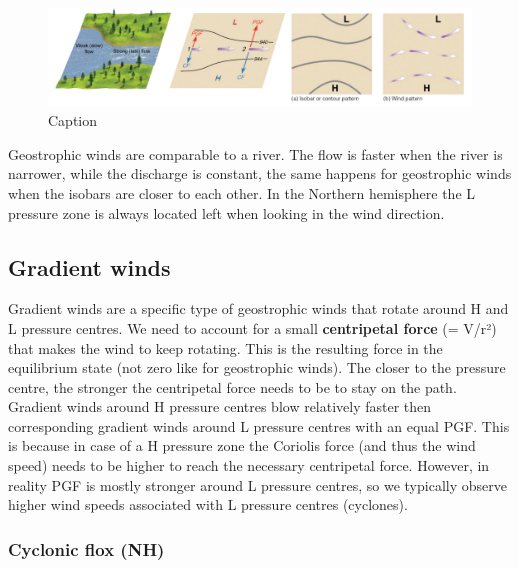 \documentclass[12pt,oneside]{book}
\begin{document}
\begin{figure}

{\centering \includegraphics[width=0.8\linewidth]{figures/Figure49} 

}

\caption{Caption}\label{fig:PGF}
\end{figure}

Geostrophic winds are comparable to a river. The flow is faster when the
river is narrower, while the discharge is constant, the same happens for
geostrophic winds when the isobars are closer to each other. In the
Northern hemisphere the L pressure zone is always located left when
looking in the wind direction.

\subsection{Gradient winds}\label{gradient-winds}

Gradient winds are a specific type of geostrophic winds that rotate
around H and L pressure centres. We need to account for a small
\textbf{centripetal force} (= V/r²) that makes the wind to keep
rotating. This is the resulting force in the equilibrium state (not zero
like for geostrophic winds). The closer to the pressure centre, the
stronger the centripetal force needs to be to stay on the path. Gradient
winds around H pressure centres blow relatively faster then
corresponding gradient winds around L pressure centres with an equal
PGF. This is because in case of a H pressure zone the Coriolis force
(and thus the wind speed) needs to be higher to reach the necessary
centripetal force. However, in reality PGF is mostly stronger around L
pressure centres, so we typically observe higher wind speeds associated
with L pressure centres (cyclones).

\subsubsection{Cyclonic flox (NH)}\label{cyclonic-flox-nh}
\end{document}
